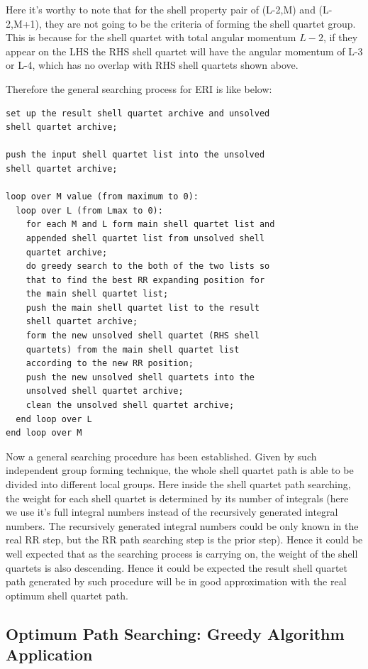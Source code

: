 Here it's worthy to note that for the shell property pair of (L-2,M) and (L-2,M+1),
they are not going to be the criteria of forming the shell quartet group. This 
is because for the shell quartet with total angular momentum $L-2$, if they 
appear on the LHS the RHS shell quartet will have the angular momentum of L-3 or 
L-4, which has no overlap with RHS shell quartets shown above.

Therefore the general searching process for ERI is like below:
\begin{verbatim}
set up the result shell quartet archive and unsolved
shell quartet archive;

push the input shell quartet list into the unsolved
shell quartet archive;

loop over M value (from maximum to 0):
  loop over L (from Lmax to 0):
    for each M and L form main shell quartet list and 
    appended shell quartet list from unsolved shell
    quartet archive;
    do greedy search to the both of the two lists so
    that to find the best RR expanding position for 
    the main shell quartet list;
    push the main shell quartet list to the result
    shell quartet archive;
    form the new unsolved shell quartet (RHS shell 
    quartets) from the main shell quartet list 
    according to the new RR position;
    push the new unsolved shell quartets into the 
    unsolved shell quartet archive;
    clean the unsolved shell quartet archive;
  end loop over L
end loop over M
\end{verbatim}

Now a general searching procedure has been established. Given by 
such independent group forming technique, the whole shell quartet
path is able to be divided into different local groups. Here inside
the shell quartet path searching, the weight for each shell quartet
is determined by its number of integrals (here we use it's full integral
numbers instead of the recursively generated integral numbers. The 
recursively generated integral numbers could be only known in the real
RR step, but the RR path searching step is the prior step). Hence it could 
be well expected that as the searching process is carrying on, the weight
of the shell quartets is also descending. Hence it could be expected the 
result shell quartet path generated by such procedure will be in good 
approximation with the real optimum shell quartet path.

\subsection{Optimum Path Searching: Greedy Algorithm Application}
%
%
\label{vrr_sq_search2}

